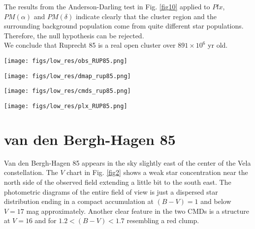 \documentclass{aa}
\begin{document}
The results from the Anderson-Darling test in Fig. \ref{fig10} applied to $Plx$,
$PM(\alpha)$ and $PM(\delta)$ indicate clearly that the cluster region and the
surrounding background population come from quite different star populations.
Therefore, the null hypothesis can be rejected.\\

We conclude that Ruprecht 85 is a real open cluster over $891\times10^6$ yr old.

\begin{figure*}[ht]
    \centering
    \texttt{[image: figs/low\_res/obs\_RUP85.png]}
    \caption{Idem Fig. \ref{fig3} for Ruprecht 85.}
    \label{fig7}
\end{figure*}

\begin{figure*}[ht]
    \centering
    \texttt{[image: figs/low\_res/dmap\_rup85.png]}
    \caption{Idem Fig. \ref{fig4} for Ruprecht 85.}
    \label{fig8}
\end{figure*}

\begin{figure*}[ht]
    \centering
    \texttt{[image: figs/low\_res/cmds\_rup85.png]}
    \caption{Idem Fig. \ref{fig5} for Ruprecht 85.}
    \label{fig9}
\end{figure*}

\begin{figure*}[ht]
    \centering
    \texttt{[image: figs/low\_res/plx\_RUP85.png]}
    \caption{Idem Fig. \ref{fig6} for Ruprecht 85.}
    \label{fig10}
\end{figure*}



\section{van den Bergh-Hagen 85}

Van den Bergh-Hagen 85 appears in the sky slightly east of the center of the
Vela constellation. The $V$ chart in Fig. \ref{fig2} shows a weak star
concentration near the north side of the observed field extending a little bit
to the south east. The photometric diagrams of the entire field of view is just
a dispersed star distribution ending in a compact accumulation at $(B-V)=1$ and
below $V = 17$ mag approximately. Another clear feature in the two CMDs is a
structure at $V = 16$ and for $1.2 < (B-V) < 1.7$ resembling a red clump.\\
\end{document}
